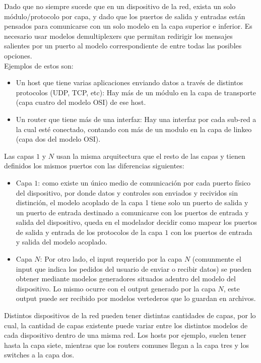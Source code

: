 \documentclass[10pt,a4paper]{article}
\begin{document}
Dado que no siempre sucede que en un dispositivo de la red, exista un solo módulo/protocolo por capa, y dado que los puertos de salida y entradas están pensados para comunicarse con un solo modelo en la capa superior e inferior. Es necesario usar modelos demultiplexers que permitan redirigir los mensajes salientes por un puerto al modelo correspondiente de entre todas las posibles opciones.\\

Ejemplos de estos son: 
\begin{itemize}
\item Un host que tiene varias aplicaciones enviando datos a través de distintos protocolos (UDP, TCP, etc): Hay más de un módulo en la capa de transporte (capa cuatro del modelo OSI) de ese host.
\item  Un router que tiene más de una interfaz: Hay una interfaz por cada sub-red a la cual esté conectado, contando con más de un modulo en la capa de linkeo (capa dos del modelo OSI).
\end{itemize}

Las capas $1$ y $N$ usan la misma arquitectura que el resto de las capas y tienen definidos los mismos puertos con las diferencias siguientes:
\begin{itemize}
\item Capa $1$: como existe un único medio de comunicación por cada puerto físico del dispositivo, por donde datos y controles son enviados y recividos sin distinción, el modelo acoplado de la capa 1 tiene solo un puerto de salida y un puerto de entrada destinado a comunicarse con los puertos de entrada y salida del dispositivo, queda en el modelador decidir como mapear los puertos de salida y entrada de los protocolos de la capa $1$ con los puertos de entrada y salida del modelo acoplado.
\item Capa $N$: Por otro lado, el input requerido por la capa $N$ (comunmente el input que indica los pedidos del usuario de enviar o recibir datos) se pueden obtener mediante modelos generadores situados adentro del modelo del dispositivo. Lo mismo ocurre con el output generado por la capa $N$, este output puede ser recibido por modelos vertederos que lo guardan en archivos.
\end{itemize}

Distintos dispositivos de la red pueden tener distintas cantidades de capas, por lo cual, la cantidad de capas existente puede variar entre los distintos modelos de cada dispositivo dentro de una misma red. Los hosts por ejemplo, suelen tener hasta la capa siete, mientras que los routers comunes llegan a la capa tres y los switches a la capa dos. \\
\end{document}
